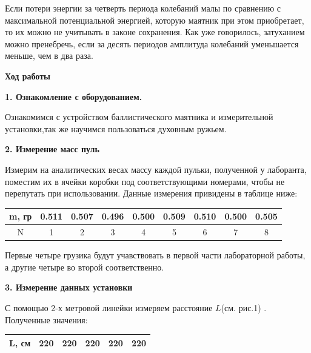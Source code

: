 \documentclass[a4paper,12pt]{article} %
\begin{document}
Если потери энергии за четверть периода колебаний малы по сравнению с максимальной потенциальной энергией, которую маятник при этом приобретает, то их можно не учитывать в законе сохранения. Как уже говорилось, затуханием можно пренебречь, если за десять периодов амплитуда колебаний уменьшается меньше, чем в два раза.
\newpage

\begin{center}
{\bf Ход работы}
\end{center}

\begin{center}
{\bf 1. Ознакомление с оборудованием.}
\end{center}

Ознакомимся с устройством баллистического маятника и измерительной установки,так же научимся пользоваться духовным ружьем.

\begin{center}
{\bf 2. Измерение масс пуль}
\end{center}

Измерим на аналитических весах массу каждой пульки, полученной у лаборанта, поместим их в ячейки коробки под соответствующими номерами, чтобы не перепутать при использовании. Данные измерения привидены в таблице ниже:

\begin{center}
\begin{tabular}{|c|c|c|c|c|c|c|c|c|}
\hline 
m, гр & 0.511 & 0.507 & 0.496 & 0.500 & 0.509 & 0.510 & 0.500 & 0.505 \\ 
\hline 
N & 1 & 2 & 3 & 4 & 5 & 6 & 7 & 8\\ 
\hline 
\end{tabular} 
\end{center}

Первые четыре грузика будут учавствовать в первой части лабораторной работы, а другие четыре во второй соответственно.

\begin{center}
{\bf 3. Измерение данных установки}
\end{center}

С помощью 2-х метровой линейки измеряем расстояние $L$(см. рис.1) . Полученные значения:
\begin{center}
\begin{tabular}{|c|c|c|c|c|c|}
\hline 
L, см  & 220 & 220 & 220 & 220 & 220\\ 
\hline 
\end{tabular} 
\end{center}
\end{document}
